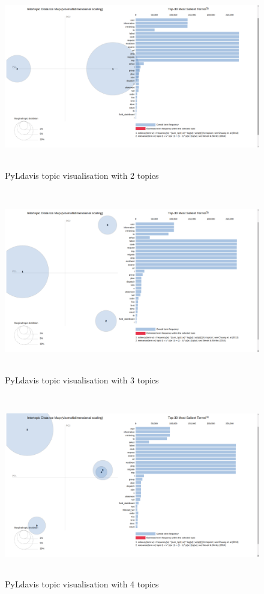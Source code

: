 \begin{figure}[!h]
    \centering
    \includegraphics[width=15cm, height=8cm,trim=0 0 100px 0, clip=true]{figures/pyldavis/pyldavis_2.png}
    \caption{PyLdavis topic visualisation with 2 topics}
    \label{fig:pyldavis_2}
\end{figure}

 \begin{figure}[!h]
    \centering
    \includegraphics[width=15cm, height=8cm,trim=0 0 100px 0, clip=true]{figures/pyldavis/pyldavis_3.png}
    \caption{PyLdavis topic visualisation with 3 topics}
    \label{fig:pyldavis_3}
\end{figure}

 \begin{figure}[!h]
    \centering
    \includegraphics[width=15cm, height=8cm,trim=0 0 100px 0, clip=true]{figures/pyldavis/pyldavis_4.png}
    \caption{PyLdavis topic visualisation with 4 topics}
    \label{fig:pyldavis_4}
\end{figure}


